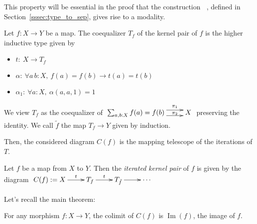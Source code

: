 \documentclass[notfinal]{jfrarticle}
\makeatletter
\def\dar[#1]#2{\ar@<-#2>[#1]\ar@<#2>[#1]} %
\DeclareMathOperator{\im}{Im}
\newcommand \separated {\mathop{\square_{n+1}} }
\makeatother
\begin{document}
This property will be essential in the proof that the construction
$\separated$, defined in Section~\ref{sssec:type_to_sep}, gives rise to a modality.

\begin{defi}
  Let $f:X \to Y$ be a map. The coequalizer $T_f$ of the kernel pair of $f$ is the higher inductive type given
  by
  \begin{itemize}
  \item $t:~X \to T_f$
  \item $\alpha:~\forall a\,b:X,~f(a) = f(b) \to t(a) = t(b)$
  \item $\alpha_1:~\forall a:X,~\alpha(a, a, 1) = 1$
  \end{itemize}
  We view $T_f$ as the coequalizer of
  $\xymatrix{
    \sum_{a,b:X} f(a) = f(b) \dar[r]{4pt}^-{\pi_1}_-{\pi_2} & X
  }$
  preserving the identity.
  We call $\tilde f$ the map $T_f \to Y$ given by induction.
\end{defi}

Then, the considered diagram $C(f)$  is the mapping telescope of the iterations
of $T$.
\begin{defi}
  Let $f$ be a map from $X$ to $Y$. Then the {\em iterated kernel pair} of
  $f$ 
  is given by the diagram
  $\xymatrix{
    C(f) := X \ar[r]^-t & T_f \ar[r]^-t & T_{\tilde f} \ar[r] &\cdots
  }$
\end{defi}

Let's recall the main theorem:
\begin{thm}\label{cech}
  For any morphism $f : X \to Y$, the colimit of $C(f)$ is $\im(f)$,
  the image of $f$.
\end{thm}


\end{document}
